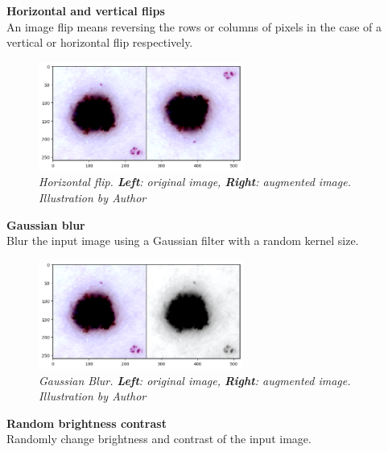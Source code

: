 \newpage

\textbf{Horizontal and vertical flips} \\

    An image flip means reversing the rows or columns of pixels in the case of a vertical or horizontal flip respectively.

    \begin{figure}[H]
    \centering
    \includegraphics[width=0.6\textwidth]{imatges/methodological_contribution/horizontal-flip.png}
    \caption[Horizontal Flip]{\textit{Horizontal flip. \textbf{Left}: original image, \textbf{Right}: augmented image. Illustration by Author}}
    \end{figure}

\vspace{0.5cm}
\textbf{Gaussian blur} \\

Blur the input image using a Gaussian filter with a random kernel size.

    \begin{figure}[H]
    \centering
    \includegraphics[width=0.6\textwidth]{imatges/methodological_contribution/gaussianblur.png}
    \caption[Gaussian Blur]{\textit{Gaussian Blur. \textbf{Left}: original image, \textbf{Right}: augmented image. Illustration by Author}}
    \end{figure}

\newpage

\textbf{Random brightness contrast} \\

Randomly change brightness and contrast of the input image.

